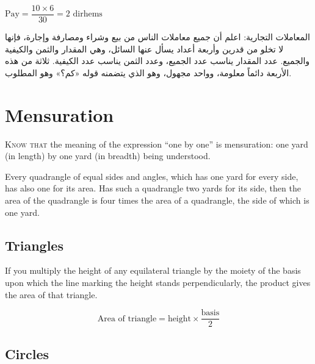 \documentclass[11pt,a4paper]{book}
\begin{document}
$\text{Pay} = \dfrac{10 \times 6}{30} = 2 \text{ dirhems}$

\begin{arabicbox}
\begin{Arabic}
المعاملات التجارية: اعلم أن جميع معاملات الناس من بيع وشراء
ومصارفة وإجارة، فإنها لا تخلو من قدرين وأربعة أعداد يسأل
عنها السائل، وهي المقدار والثمن والكيفية والجميع. عدد المقدار
يناسب عدد الجميع، وعدد الثمن يناسب عدد الكيفية. ثلاثة من هذه
الأربعة دائماً معلومة، وواحد مجهول، وهو الذي يتضمنه قوله «كم؟»
وهو المطلوب.
\end{Arabic}
\end{arabicbox}

\newpage

\chapter{Mensuration}
\label{ch:mensuration}

\lettrine[lines=3, lhang=0.33, nindent=0em, findent=3pt]{
\textcolor{dropgold}{K}}{now that} the meaning of the expression ``one by one'' is mensuration: one
yard (in length) by one yard (in breadth) being understood.

Every quadrangle of equal sides and angles, which has one yard for every
side, has also one for its area. Has such a quadrangle two yards for its
side, then the area of the quadrangle is four times the area of a quadrangle,
the side of which is one yard.

\section*{Triangles}

If you multiply the height of any equilateral triangle by the moiety of the
basis upon which the line marking the height stands perpendicularly, the
product gives the area of that triangle.

\begin{equation}
\text{Area of triangle} = \text{height} \times \frac{\text{basis}}{2}
\end{equation}

\section*{Circles}
\end{document}
